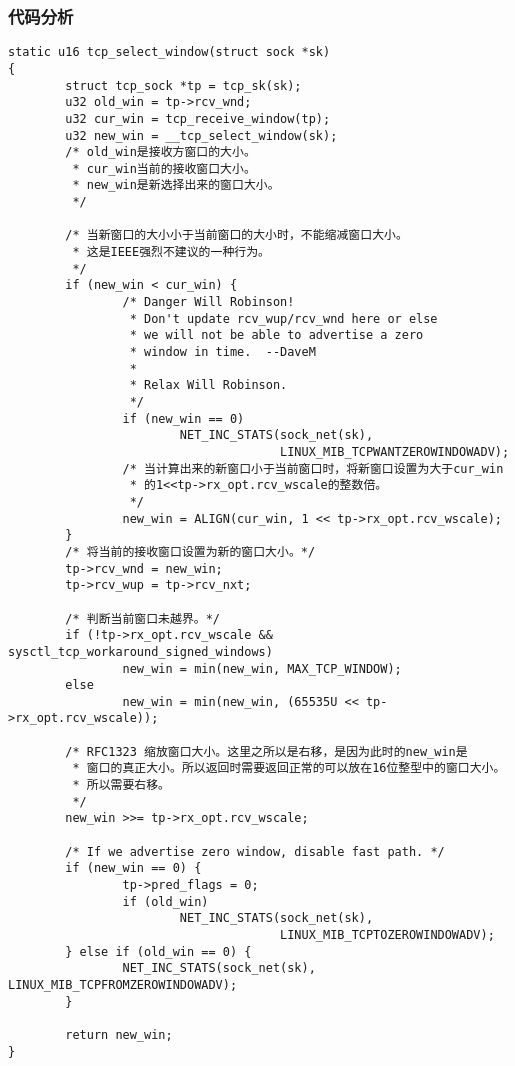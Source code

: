 \subsubsection{代码分析}
\begin{verbatim}
static u16 tcp_select_window(struct sock *sk)
{
        struct tcp_sock *tp = tcp_sk(sk);
        u32 old_win = tp->rcv_wnd;
        u32 cur_win = tcp_receive_window(tp);
        u32 new_win = __tcp_select_window(sk);
        /* old_win是接收方窗口的大小。
         * cur_win当前的接收窗口大小。
         * new_win是新选择出来的窗口大小。
         */

        /* 当新窗口的大小小于当前窗口的大小时，不能缩减窗口大小。
         * 这是IEEE强烈不建议的一种行为。
         */
        if (new_win < cur_win) {
                /* Danger Will Robinson!
                 * Don't update rcv_wup/rcv_wnd here or else
                 * we will not be able to advertise a zero
                 * window in time.  --DaveM
                 *
                 * Relax Will Robinson.
                 */
                if (new_win == 0)
                        NET_INC_STATS(sock_net(sk),
                                      LINUX_MIB_TCPWANTZEROWINDOWADV);
                /* 当计算出来的新窗口小于当前窗口时，将新窗口设置为大于cur_win
                 * 的1<<tp->rx_opt.rcv_wscale的整数倍。
                 */
                new_win = ALIGN(cur_win, 1 << tp->rx_opt.rcv_wscale);
        }
        /* 将当前的接收窗口设置为新的窗口大小。*/
        tp->rcv_wnd = new_win;
        tp->rcv_wup = tp->rcv_nxt;

        /* 判断当前窗口未越界。*/
        if (!tp->rx_opt.rcv_wscale && sysctl_tcp_workaround_signed_windows)
                new_win = min(new_win, MAX_TCP_WINDOW);
        else
                new_win = min(new_win, (65535U << tp->rx_opt.rcv_wscale));

        /* RFC1323 缩放窗口大小。这里之所以是右移，是因为此时的new_win是
         * 窗口的真正大小。所以返回时需要返回正常的可以放在16位整型中的窗口大小。
         * 所以需要右移。
         */
        new_win >>= tp->rx_opt.rcv_wscale;

        /* If we advertise zero window, disable fast path. */
        if (new_win == 0) {
                tp->pred_flags = 0;
                if (old_win)
                        NET_INC_STATS(sock_net(sk),
                                      LINUX_MIB_TCPTOZEROWINDOWADV);
        } else if (old_win == 0) {
                NET_INC_STATS(sock_net(sk), LINUX_MIB_TCPFROMZEROWINDOWADV);
        }

        return new_win;
}
\end{verbatim}


